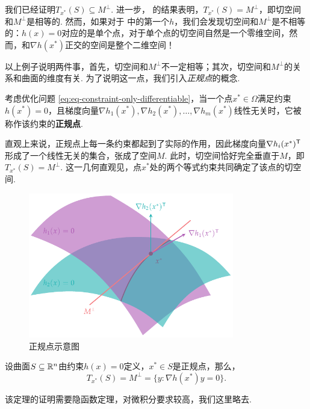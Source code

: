 我们已经证明$T_{x^*}(S)\subseteq M^\perp$. 进一步， 的结果表明，$T_{x^*}(S)=M^\perp$，即切空间和$M^\perp$是相等的. 然而，如果对于 中的第一个$h$，我们会发现切空间和$M^\perp$是不相等的：$h(x)=0$对应的是单个点，对于单个点的切空间自然是一个零维空间，然而，和$\nabla h(x^*)$正交的空间是整个二维空间！

以上例子说明两件事，首先，切空间和$M^\perp$不一定相等；其次，切空间和$M^\perp$的关系和曲面的维度有关. 为了说明这一点，我们引入\emph{正规点}的概念. 

\begin{definition}[正规点]\label{def:regular-point}
考虑优化问题 \eqref{eq:eq-constraint-only-differentiable}，当一个点$x^*\in\Omega$满足约束${h(x^*)}=0$，且梯度向量$\nabla h_1(x^*),\nabla h_2(x^*),\dots,\nabla h_m(x^*)$线性无关时，它被称作该约束的\textbf{正规点}. 
\end{definition}

直观上来说，正规点上每一条约束都起到了实际的作用，因此梯度向量$\nabla h_i(x^*)^{\mathsf{T}}$形成了一个线性无关的集合，张成了空间$M$. 此时，切空间恰好完全垂直于$M$，即$T_{x^*}(S)=M^\perp$. 这一几何直观见，点${x^* }$处的两个等式约束共同确定了该点的切空间.
\begin{figure}[ht]
    \centering
    \includegraphics[width=0.8\textwidth]{figures/duality/tan-2constraint.pdf}
    \caption{正规点示意图}
    \label{fig:tan-2constraint}
\end{figure}

\begin{theorem}[正规点切空间刻画定理]\label{thm:tan-space-characterize}
设曲面$S\subseteq\mathbb{R}^n$由约束$h(x)=0$定义，$x^*\in S$是正规点，那么，
\[T_{x^*}(S)=M^\perp=\{{y:\nabla h(x^*)y=0}\}.\]
\end{theorem}
该定理的证明需要隐函数定理，对微积分要求较高，我们这里略去.

